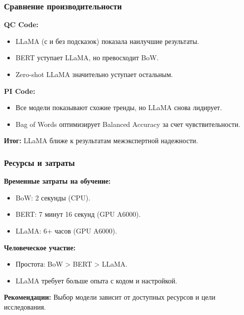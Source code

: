 \documentclass[aspectratio=169]{beamer}
\begin{document}
\begin{frame}
    \frametitle{Сравнение производительности}
    \textbf{QC Code:} \\
    \begin{itemize}
        \item LLaMA (с и без подсказок) показала наилучшие результаты.
        \item BERT уступает LLaMA, но превосходит BoW.
        \item Zero-shot LLaMA значительно уступает остальным.
    \end{itemize}
    \textbf{PI Code:} \\
    \begin{itemize}
        \item Все модели показывают схожие тренды, но LLaMA снова лидирует.
        \item Bag of Words оптимизирует Balanced Accuracy за счет чувствительности.
    \end{itemize}
    \textbf{Итог:} LLaMA ближе к результатам межэкспертной надежности.
\end{frame}

\begin{frame}
    \frametitle{Ресурсы и затраты}
    \textbf{Временные затраты на обучение:} \\
    \begin{itemize}
        \item BoW: 2 секунды (CPU).
        \item BERT: 7 минут 16 секунд (GPU A6000).
        \item LLaMA: 6+ часов (GPU A6000).
    \end{itemize}
    \textbf{Человеческое участие:} \\
    \begin{itemize}
        \item Простота: BoW > BERT > LLaMA.
        \item LLaMA требует больше опыта с кодом и настройкой.
    \end{itemize}
    \textbf{Рекомендации:} Выбор модели зависит от доступных ресурсов и цели исследования.
\end{frame}
\end{document}
